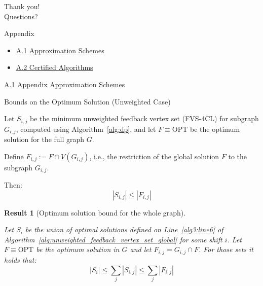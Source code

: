 \documentclass{beamer}
\newtheorem{result}{Result}
\newcommand{\backupbegin}{}
\begin{document}
\begin{frame}
  \centering
  \Huge Thank you!\\
  \vspace{0.5cm}
  \Large Questions?
\end{frame}

\appendix
\backupbegin

\begin{frame}
  \centering
  {\Huge Appendix}

  \vspace{2em}

  \Large
  \begin{itemize}
      \item \hyperlink{appendix-a1}{A.1 Approximation Schemes}
      \item \hyperlink{appendix-a2}{A.2 Certified Algorithms}
  \end{itemize}
\end{frame}

\begin{frame}{A.1}
  \hypertarget{appendix-a1}{}
  \centering
  \Huge Appendix Approximation Schemes
\end{frame}

\begin{frame}{Bounds on the Optimum Solution (Unweighted Case)}
    \footnotesize
    \begin{lemma}
    \label{lemma:opt-unweighted-fvs-4cl}

    Let \( S_{i,j} \) be the minimum unweighted feedback vertex set (FVS-4CL)
    for subgraph \( G_{i,j} \), computed using 
    Algorithm~\ref{alg:dp}, and let 
    \( F \equiv \text{OPT} \) be the optimum solution for the full graph \( G \).

    Define \( F_{i,j} := F \cap V(G_{i,j}) \), i.e., the restriction of the global solution \( F \) to the subgraph \( G_{i,j} \).

    Then:
    \[
    |S_{i,j}| \leq |F_{i,j}|
    \]
    \end{lemma}

    \begin{result}[Optimum solution bound for the whole graph]
    \label{result-two}

    Let \( S_i \) be the union of optimal solutions defined on Line~\ref{alg3:line6} of Algorithm~\ref{alg:unweighted_feedback_vertex_set_global} 
    for some shift \( i \). 
    Let \( F \equiv \text{OPT} \) be the optimum solution in \( G \) and let \( F_{i,j} = G_{i,j} \cap F \).
    For those sets it holds that:
    \[
    |S_i| \leq \sum_j |S_{i,j}| \leq \sum_j |F_{i,j}|
    \]
    \end{result}

\end{frame}
\end{document}
